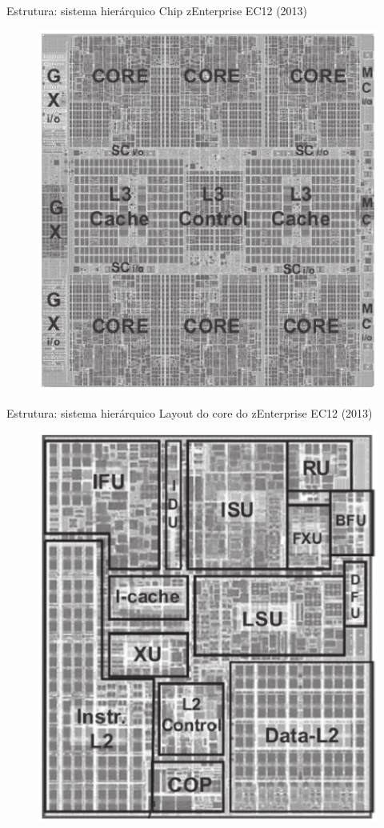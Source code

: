 \begin{slide}[toc=]{Estrutura: sistema hierárquico}
	Chip zEnterprise EC12 (2013)
    \begin{figure}[h]
      \centering
      \includegraphics[height = 0.73\textheight]{figs/EC12.eps}
    \end{figure}
\end{slide}

\begin{slide}[toc=]{Estrutura: sistema hierárquico}
	Layout do core do zEnterprise EC12 (2013)
    \begin{figure}[h]
      \centering
      \includegraphics[height = 0.73\textheight]{figs/layout_EC12.eps}
    \end{figure}
\end{slide}


